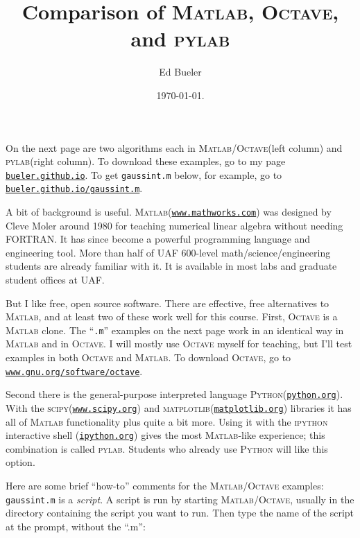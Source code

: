 \documentclass[11pt]{amsart}
\newcommand{\Matlab}{\textsc{Matlab}\xspace}
\newcommand{\Octave}{\textsc{Octave}\xspace}
\newcommand{\python}{\textsc{Python}\xspace}
\newcommand{\pylab}{\textsc{pylab}\xspace}
\newcommand{\scipy}{\textsc{scipy}\xspace}
\newcommand{\matplotlib}{\textsc{matplotlib}\xspace}
\begin{document}
\title{Comparison of \textsc{Matlab}, \textsc{Octave}, and \textsc{pylab}}

\author{Ed Bueler}

\date{\today.}

\maketitle
\normalsize
\thispagestyle{empty}

\newcommand{\hrf}[2]{\href{#1}{\texttt{#2}}}

On the next page are two algorithms each in \Matlab/\Octave (left column) and \pylab (right column).  To download these examples, go to my page \hrf{http://bueler.github.io}{bueler.github.io}.  To get \texttt{gaussint.m} below, for example, go to \hrf{http://bueler.github.io/gaussint.m}{bueler.github.io/gaussint.m}.

A bit of background is useful.  \Matlab (\hrf{http://www.mathworks.com/}{www.mathworks.com}) was designed by Cleve Moler around 1980 for teaching numerical linear algebra without needing FORTRAN.  It has since become a powerful programming language and engineering tool.  More than half of UAF 600-level math/science/engineering students are already familiar with it.  It is available in most labs and graduate student offices at UAF.

But I like free, open source software.  There are effective, free alternatives to \Matlab, and at least two of these work well for this course.  First, \Octave is a \Matlab clone.  The ``\texttt{.m}'' examples on the next page work in an identical way in \Matlab and in \Octave.  I will mostly use \Octave myself for teaching, but I'll test examples in both \Octave and \Matlab.  To download \Octave, go to 
\hrf{http://www.gnu.org/software/octave/}{www.gnu.org/software/octave}.

Second there is the general-purpose interpreted language \python (\hrf{http://python.org/}{python.org}).  With the \scipy (\hrf{http://www.scipy.org/}{www.scipy.org}) and \matplotlib (\hrf{http://matplotlib.org/}{matplotlib.org}) libraries it has all of \Matlab functionality plus quite a bit more.  Using it with the \textsc{ipython} interactive shell (\hrf{http://ipython.org/}{ipython.org}) gives the most \Matlab-like experience; this combination is called \pylab.  Students who already use \python will like this option.

Here are some brief ``how-to'' comments for the \Matlab/\Octave examples: \texttt{gaussint.m} is a \emph{script}.  A script is run by starting \Matlab/\Octave, usually in the directory containing the script you want to run.  Then type the name of the script at the prompt, without the ``.m'':
\end{document}
